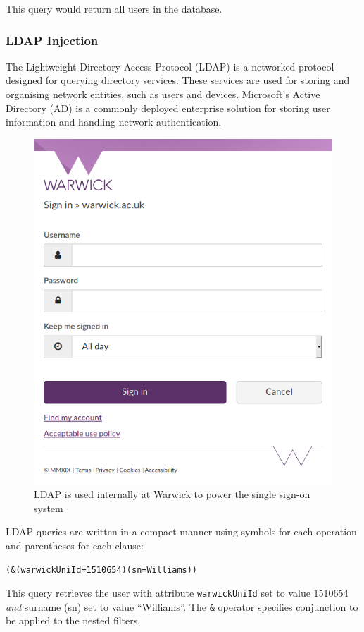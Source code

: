 This query would return all users in the database.

\subsubsection{LDAP Injection}

The Lightweight Directory Access Protocol (LDAP) is a networked protocol designed for querying directory services.
These services are used for storing and organising network entities, such as users and devices.
Microsoft's Active Directory (AD) is a commonly deployed enterprise solution for storing user information and handling
network authentication.

\begin{figure}[H]
    \begin{MyMdframed}
        \vspace{0.5em}


        \caption{\label{figure:wso}LDAP is used internally at Warwick to power the single sign-on system}
        \vspace{0.5em}
        \captionsetup{style=default}
        \begin{adjustbox}{center}\includegraphics[width=0.5\linewidth]{wso.png}\end{adjustbox}
    \end{MyMdframed}

\end{figure}

LDAP queries are written in a compact manner using symbols for each operation and parentheses for each clause:

\texttt{(\&(warwickUniId=1510654)(sn=Williams))}

This query retrieves the user with attribute \texttt{warwickUniId} set to value 1510654 \emph{and} surname (sn) set to value
``Williams''.
The \texttt{\&} operator specifies conjunction to be applied to the nested filters.

